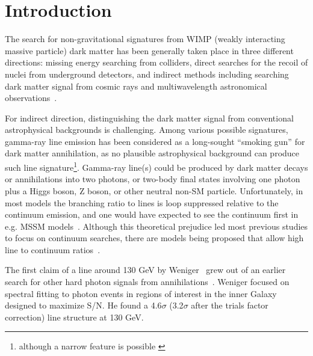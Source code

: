 \documentclass[aps,twocolumn,prd,superscriptaddress,showpacs,nofootinbib,fixfloat]{revtex4}
\begin{document}


\section{Introduction}


The search for non-gravitational signatures from WIMP{}
(weakly interacting massive particle) dark matter has been
generally taken place in three different directions: missing
energy searching from colliders, direct searches for the
recoil of nuclei from underground detectors, and indirect
methods including searching dark matter signal from cosmic
rays and multiwavelength astronomical
observations~\citep{Jungman:1995df,Bergstrom:2000,Bertone:2005,Hooper:2007Review,
  2012arXiv1205.4882B}.

For indirect direction, distinguishing the dark matter
signal from conventional astrophysical backgrounds is
challenging.  Among various possible signatures, gamma-ray
line emission has been considered as a long-sought ``smoking
gun'' for dark matter annihilation, as no plausible
astrophysical background can produce such line
signature\footnote{although a narrow feature is possible
  \citep[see][]{2012arXiv1207.0458A}}.  Gamma-ray line(s)
could be produced by dark matter decays or annihilations
into two photons, or two-body final states involving one
photon plus a Higgs boson, Z boson, or other neutral non-SM
particle. Unfortunately, in most models the branching ratio
to lines is loop suppressed relative to the continuum
emission, and one would have expected to see the continuum
first in e.g. MSSM models~\citep[e.g.][]{Bergstrom:1997}.
Although this theoretical prejudice led most previous
studies to focus on continuum searches, there are models
being proposed that allow high line to continuum
ratios~\citep[e.g.][]{Bergstrom:1998, Bergstrom:2000,
  Bertone:2009, Jackson:2010, Cline:2012, Weiner:2012}.

The first claim of a line around 130 GeV by 
Weniger~\citep{Weniger:2012} grew
out of an earlier search for other hard photon signals from
annihilations~\citep{Bringmann:2012}.  Weniger focused on
spectral fitting to photon events in regions of interest 
in the inner Galaxy
designed to maximize S/N.  He found a 4.6$\sigma$
(3.2$\sigma$ after the trials factor correction) line
structure at 130 GeV.
\end{document}

